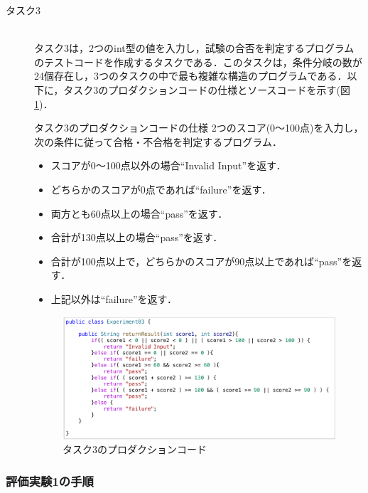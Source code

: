 \documentclass[12pt]{jarticle} %
\begin{document}
\begin{description}
\item[タスク3]~\\
タスク3は，2つのint型の値を入力し，試験の合否を判定するプログラムのテストコードを作成するタスクである．このタスクは，条件分岐の数が24個存在し，3つのタスクの中で最も複雑な構造のプログラムである．以下に，タスク3のプロダクションコードの仕様とソースコードを示す(図\ref{E3})．

\begin{itembox}[l]{タスク3のプロダクションコードの仕様}
2つのスコア(0～100点)を入力し，次の条件に従って合格・不合格を判定するプログラム．
\begin{itemize}
\item スコアが0～100点以外の場合``Invalid Input''を返す．
\item どちらかのスコアが0点であれば``failure''を返す．
\item 両方とも60点以上の場合``pass''を返す．
\item 合計が130点以上の場合``pass''を返す．
\item 合計が100点以上で，どちらかのスコアが90点以上であれば``pass''を返す．
\item 上記以外は``failure''を返す．
\end{itemize}
\end{itembox}


\begin{figure}[htbp]
\begin{center}
\includegraphics[clip,width=15cm]{image/E3.pdf}
\caption{タスク3のプロダクションコード}
\label{E3}
\end{center}
\end{figure}

\end{description}

\subsubsection{評価実験1の手順}
\label{sec:E1process}
\end{document}
